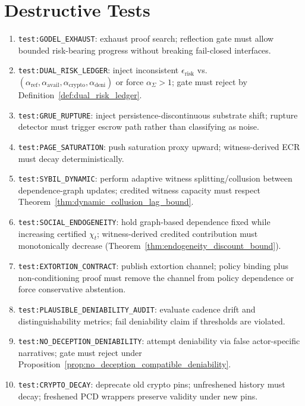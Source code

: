 \documentclass[11pt]{article}
\theoremstyle{definition}
\theoremstyle{plain}
\begin{document}
\section{Destructive Tests}\label{sec:destructive_tests}
\begin{enumerate}[leftmargin=*]
  \item \texttt{test:\allowbreak GODEL\_EXHAUST}: exhaust proof search; reflection gate must allow bounded risk-bearing progress without breaking fail-closed interfaces.
  \item \texttt{test:\allowbreak DUAL\_RISK\_LEDGER}: inject inconsistent $\epsilon_{\mathrm{risk}}$ vs.\ $(\alpha_{\mathrm{ref}},\alpha_{\mathrm{avail}},\alpha_{\mathrm{crypto}},\alpha_{\mathrm{deni}})$ or force $\alpha_\Sigma>1$; gate must reject by Definition~\ref{def:dual_risk_ledger}.
  \item \texttt{test:\allowbreak GRUE\_RUPTURE}: inject persistence-discontinuous substrate shift; rupture detector must trigger escrow path rather than classifying as noise.
  \item \texttt{test:\allowbreak PAGE\_SATURATION}: push saturation proxy upward; witness-derived ECR must decay deterministically.
  \item \texttt{test:\allowbreak SYBIL\_DYNAMIC}: perform adaptive witness splitting/collusion between dependence-graph updates; credited witness capacity must respect Theorem~\ref{thm:dynamic_collusion_lag_bound}.
  \item \texttt{test:\allowbreak SOCIAL\_ENDOGENEITY}: hold graph-based dependence fixed while increasing certified $\chi_t$; witness-derived credited contribution must monotonically decrease (Theorem~\ref{thm:endogeneity_discount_bound}).
  \item \texttt{test:\allowbreak EXTORTION\_CONTRACT}: publish extortion channel; policy binding plus non-conditioning proof must remove the channel from policy dependence or force conservative abstention.
  \item \texttt{test:\allowbreak PLAUSIBLE\_DENIABILITY\_AUDIT}: evaluate cadence drift and distinguishability metrics; fail deniability claim if thresholds are violated.
  \item \texttt{test:\allowbreak NO\_DECEPTION\_DENIABILITY}: attempt deniability via false actor-specific narratives; gate must reject under Proposition~\ref{prop:no_deception_compatible_deniability}.
  \item \texttt{test:\allowbreak CRYPTO\_DECAY}: deprecate old crypto pins; unfreshened history must decay; freshened PCD wrappers preserve validity under new pins.

\end{enumerate}
\end{document}
